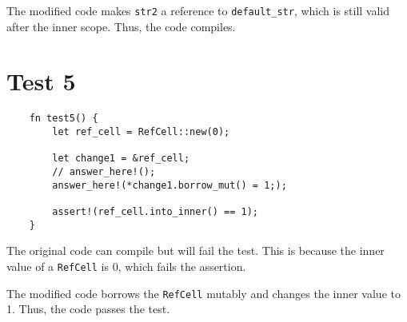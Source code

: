 \documentclass[a4paper,12pt]{article}
\begin{document}
The modified code makes \texttt{str2} a reference to \texttt{default\_str}, which is still valid after the inner scope. Thus, the code compiles.

\section*{Test 5}

\begin{verbatim}
    fn test5() {
        let ref_cell = RefCell::new(0);
    
        let change1 = &ref_cell;
        // answer_here!();
        answer_here!(*change1.borrow_mut() = 1;);
    
        assert!(ref_cell.into_inner() == 1);
    }
\end{verbatim}

The original code can compile but will fail the test. This is because the inner value of a \texttt{RefCell} is 0, which fails the assertion.

The modified code borrows the \texttt{RefCell} mutably and changes the inner value to 1. Thus, the code passes the test.
\end{document}
